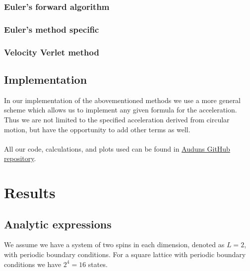 \documentclass[a4paper, fontsize=11pt]{article}
\begin{document}
\subsubsection{Euler's forward algorithm}


\subsubsection{Euler's method specific}



\subsubsection{Velocity Verlet method}



\subsection{Implementation}

In our implementation of the abovementioned methods we use a more general scheme which allows us to implement any given formula for the acceleration. Thus we are not limited to the specified acceleration derived from circular motion, but have the opportunity to add other terms as well. 


\paragraph{}
All our code, calculations, and plots used can be found in \href{https://github.com/auduntre/FYS4150/tree/master/Project%203}{Auduns GitHub repository}.

\section{Results}


\subsection{Analytic expressions}
We assume we have a system of two spins in each dimension, denoted as $L = 2$, with periodic boundary conditions. For a square lattice with periodic boundary conditions we have $2^4 = 16$ states. 
\end{document}
